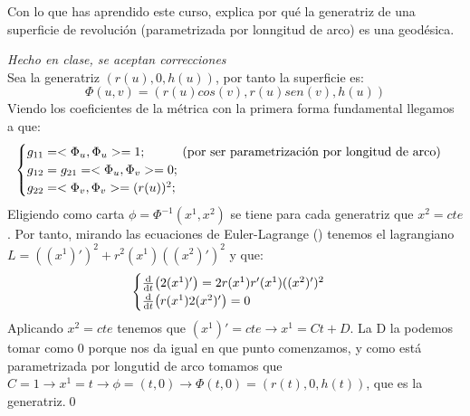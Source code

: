 \begin{problem}[11] Con lo que has aprendido este curso, explica por qué la generatriz de una superficie de revolución (parametrizada por lonngitud de arco) es una geodésica.
	
	\solution\textit{Hecho en clase, se aceptan correcciones}\\ Sea la generatriz $(r(u),0,h(u))$, por tanto la superficie es: $$\Phi(u,v)=(r(u)cos(v),r(u)sen(v),h(u))$$ Viendo los coeficientes de la métrica con la primera forma fundamental llegamos a que: $$\begin{cases}g_{11}=<\Phi_u,\Phi_u>=1;\hspace*{1cm}\text{(por ser parametrización por longitud de arco)}\\g_{12}=g_{21}=<\Phi_u,\Phi_v>=0;\\g_{22}=<\Phi_v,\Phi_v>=(r(u))^2;\end{cases}$$ Eligiendo como carta $\phi=\Phi^{-1}(x^1,x^2)$ se tiene para cada generatriz que $x^2=cte$. Por tanto, mirando las ecuaciones de Euler-Lagrange () tenemos el lagrangiano $L=((x^1)')^2+r^2(x^1)((x^2)')^2$ y que:
	$$\begin{cases}\dv{t}(2(x^1)')=2r(x^1)r'(x^1)((x^2)')^2\\\dv{t}(r(x^1)2(x^2)')=0\end{cases}$$ Aplicando $x^2=cte$ tenemos que $(x^1)'=cte\longrightarrow x^1=Ct+D$. La D la podemos tomar como 0 porque nos da igual en que punto comenzamos, y como está parametrizada por longutid de arco tomamos que $C=1\longrightarrow x^1=t\longrightarrow\phi=(t,0)\longrightarrow\Phi(t,0)=(r(t),0,h(t))$, que es la generatriz.\qed
\end{problem}

